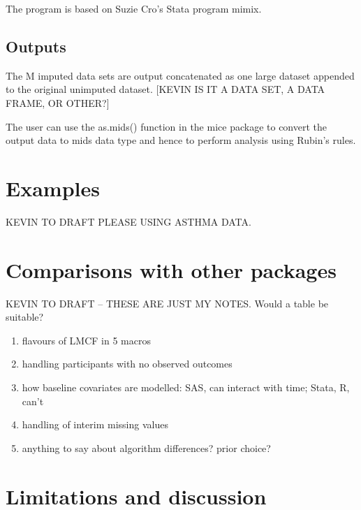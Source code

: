 The program is based on Suzie Cro’s Stata program mimix.

\subsection{Outputs}

The M imputed data sets are output concatenated as one large dataset appended to
the original unimputed dataset. [KEVIN IS IT A DATA SET, A DATA FRAME, OR OTHER?] 

The user can use the as.mids() function in the mice package to convert the output data  to mids data type and hence to perform analysis using Rubin's rules.



\section{Examples}

KEVIN TO DRAFT PLEASE USING ASTHMA DATA.


\section{Comparisons with other packages}

KEVIN TO DRAFT -- THESE ARE JUST MY NOTES. Would a table be suitable?

\begin{enumerate}
\item flavours of LMCF in 5 macros
\item handling participants with no observed outcomes
\item how baseline covariates are modelled: SAS, can interact with time; Stata, R, can't
\item handling of interim missing values
\item anything to say about algorithm differences? prior choice?
\end{enumerate}


\section{Limitations and discussion}

